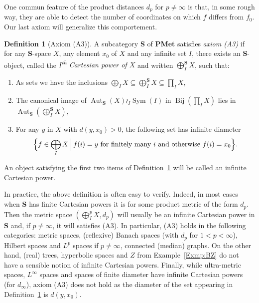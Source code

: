 \documentclass[a4paper]{article}
\theoremstyle{definition}
\newtheorem{defn}[lem]{Definition}
\DeclareMathOperator\Sym{Sym}
\DeclareMathOperator\Aut{Aut}
\DeclareMathOperator\Bij{Bij}
\newcommand*{\category}[1]{\textbf{#1}}
\newcommand*{\PMet}{\category{PMet}}
\newcommand*{\CatS}{\category{S}}
\newcommand{\setst}[2]{\{#1\ |\ #2\}}
\begin{document}
One commun feature of the product distances $d_p$ for $p\neq\infty$ is that, in some rough way, they are able to detect the number of coordinates on which $f$ differs from $f_0$.
Our last axiom will generalize this comportement.
%
%
\begin{defn}[Axiom (A3)]\label{Def:InfiniteCartesian}
A subcategory \CatS{} of \PMet{} satisfies \emph{axiom (A3)} if for any \CatS-space $X$, any element $x_0$ of $X$ and any infinite set $I$, there exists an \CatS-object, called the \emph{$I$\textsuperscript{th} Cartesian power of $X$} and written $\bigoplus_I ^\CatS X$, such that:
\begin{enumerate}
\item
As sets we have the inclusions $\bigoplus_I X\subseteq \bigoplus_I^\CatS X\subseteq \prod_I X$,
\item
The canonical image of $\Aut_{\CatS}(X)\wr_I \Sym(I)$ in $\Bij(\prod_I X)$ lies in $\Aut_{\CatS}(\bigoplus_I^\CatS X)$,
\item
For any $y$ in $X$ with $d(y,x_0)>0$, the following set has infinite diameter
\[
	\Bigl\{f\in \bigoplus_I X\,\Big|\,f(i)=y \textnormal{ for finitely many } i \textnormal{ and otherwise }f(i)=x_0\Bigr\}.
\]
\end{enumerate}
\end{defn}
%
%
An object satisfying the first two items of Definition~\ref{Def:InfiniteCartesian} will be called an infinite Cartesian power.

In practice, the above definition is often easy to verify.
Indeed, in most cases when \CatS{} has finite Cartesian powers it is for some product metric of the form $d_p$.
Then the metric space $(\bigoplus^p_IX,d_p)$ will usually be an infinite Cartesian power in \CatS{} and, if $p\neq\infty$, it will satisfies (A3).
In particular, (A3) holds in the following categories: metric spaces, (reflexive) Banach spaces (with $d_p$ for $1<p<\infty$), Hilbert spaces and $L^p$ spaces if $p\neq\infty$, connected (median) graphs.
On the other hand, (real) trees, hyperbolic spaces and $Z$ from Example~\ref{Exmp:BZ} do not have a sensible notion of infinite Cartesian powers. Finally, while ultra-metric spaces, $L^\infty$ spaces and spaces of finite diameter have infinite Cartesian powers (for $d_\infty$), axiom (A3) does not hold as the diameter of the set appearing in Definition~\ref{Def:InfiniteCartesian} is $d(y,x_0)$.
\end{document}
